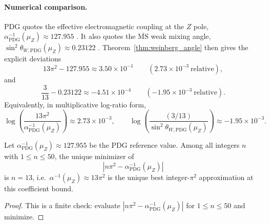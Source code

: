 \paragraph{Numerical comparison.}
PDG quotes the effective electromagnetic coupling at the $Z$ pole, $\alpha^{-1}_{\mathrm{PDG}}(\mu_Z)\approx 127.955$ \cite{PDGRPP2024}. It also quotes the $\overline{\mathrm{MS}}$ weak mixing angle, $\sin^2\theta_{W,\mathrm{PDG}}(\mu_Z)\approx 0.23122$ \cite{PDGRPP2024}. Theorem~\ref{thm:weinberg_angle} then gives the explicit deviations
\begin{equation}
13\pi^2-127.955\approx 3.50\times 10^{-1}\qquad (2.73\times 10^{-3}\ \text{relative}),
\end{equation}
and
\begin{equation}
\frac{3}{13}-0.23122\approx -4.51\times 10^{-4}\qquad (-1.95\times 10^{-3}\ \text{relative}).
\end{equation}
Equivalently, in multiplicative log-ratio form,
\begin{equation}
\log\!\left(\frac{13\pi^2}{\alpha^{-1}_{\mathrm{PDG}}(\mu_Z)}\right)\approx 2.73\times 10^{-3},
\qquad
\log\!\left(\frac{(3/13)}{\sin^2\theta_{W,\mathrm{PDG}}(\mu_Z)}\right)\approx -1.95\times 10^{-3}.
\end{equation}

\begin{proposition}\label{prop:alphaZ_integer_rigidity}
Let $\alpha^{-1}_{\mathrm{PDG}}(\mu_Z)\approx 127.955$ be the PDG reference value. Among all integers $n$ with $1\le n\le 50$, the unique minimizer of
\begin{equation}
|n\pi^2-\alpha^{-1}_{\mathrm{PDG}}(\mu_Z)|
\end{equation}
is $n=13$, i.e.\ $\alpha^{-1}(\mu_Z)\approx 13\pi^2$ is the unique best integer-$\pi^2$ approximation at this coefficient bound.
\end{proposition}
\begin{proof}
This is a finite check: evaluate $|n\pi^2-\alpha^{-1}_{\mathrm{PDG}}(\mu_Z)|$ for $1\le n\le 50$ and minimize.
\end{proof}

